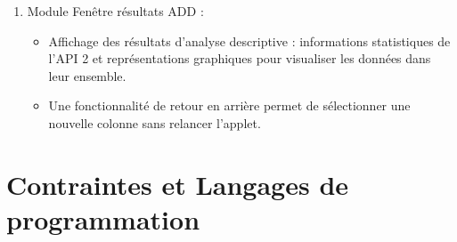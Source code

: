 \begin{description}[style=unboxed,leftmargin=0.2cm]
\begin{enumerate}
				\item Module Fenêtre résultats ADD :
					\begin{itemize}
					\item Affichage des résultats d'analyse descriptive : informations statistiques de l'API 2 et représentations graphiques pour visualiser les données dans leur ensemble.
					\item Une fonctionnalité de retour en arrière permet de sélectionner une nouvelle colonne sans relancer l'applet.
					\end{itemize}
				\end{enumerate}
			
		\end{description}
		
	\section{Contraintes et Langages de programmation}
